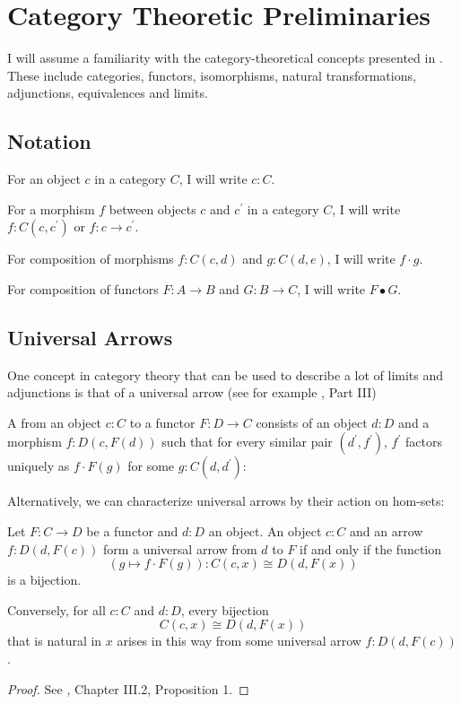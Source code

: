 \chapter{Category Theoretic Preliminaries}

I will assume a familiarity with the category-theoretical concepts presented in \autocite{CT4P}. These include categories, functors, isomorphisms, natural transformations, adjunctions, equivalences and limits.

\section{Notation}
For an object $ c $ in a category $ C $, I will write $ c: C $.

For a morphism $ f $ between objects $ c $ and $ c^\prime $ in a category $ C $, I will write $ f: C(c, c^\prime) $ or $ f: c \to c^\prime $.

For composition of morphisms $ f: C(c, d) $ and $ g: C(d, e) $, I will write $ f \cdot g $.

For composition of functors $ F: A \to B $ and $ G: B \to C $, I will write $ F \bullet G $.

\section{Universal Arrows}

One concept in category theory that can be used to describe a lot of limits and adjunctions is that of a universal arrow (see for example \autocite{MacLane}, Part III)
\begin{definition}
  A  from an object $ c: C $ to a functor $ F: D \to C $ consists of an object $ d: D $ and a morphism $ f: D(c, F(d)) $ such that for every similar pair $ (d^\prime, f^\prime) $, $ f^\prime $ factors uniquely as $ f \cdot F(g) $ for some $ g: C(d, d^\prime) $:
  \begin{center}
  \end{center}
\end{definition}

Alternatively, we can characterize universal arrows by their action on hom-sets:
\begin{lemma}
  Let $ F: C \to D $ be a functor and $ d: D $ an object. An object $ c: C $ and an arrow $ f: D(d, F(c)) $ form a universal arrow from $ d $ to $ F $ if and only if the function
  \[ (g \mapsto f \cdot F(g)) : C(c, x) \cong D(d, F(x)) \]
  is a bijection.

  Conversely, for all $ c: C $ and $ d: D $, every bijection
  \[ C(c, x) \cong D(d, F(x)) \]
  that is natural in $ x $ arises in this way from some universal arrow $ f: D(d, F(c)) $.
\end{lemma}
\begin{proof}
  See \autocite{MacLane}, Chapter III.2, Proposition 1.
\end{proof}

